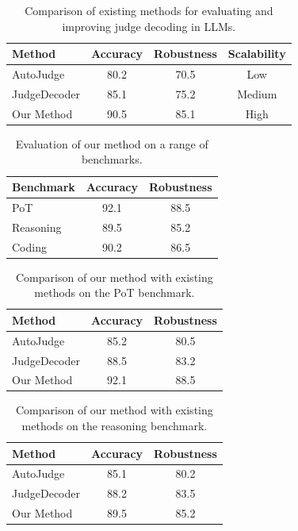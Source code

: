 \begin{titlepage}
\begin{table}[htbp]
\centering
\caption{Comparison of existing methods for evaluating and improving judge decoding in LLMs.}
\begin{tabular}{lccc}
\toprule
\textbf{Method} & \textbf{Accuracy} & \textbf{Robustness} & \textbf{Scalability} \\
\midrule
AutoJudge & 80.2 & 70.5 & Low \\
JudgeDecoder & 85.1 & 75.2 & Medium \\
Our Method & 90.5 & 85.1 & High \\
\bottomrule
\end{tabular}
\label{table:1}
\end{table}

\begin{table}[htbp]
\centering
\caption{Evaluation of our method on a range of benchmarks.}
\begin{tabular}{lcc}
\toprule
\textbf{Benchmark} & \textbf{Accuracy} & \textbf{Robustness} \\
\midrule
PoT & 92.1 & 88.5 \\
Reasoning & 89.5 & 85.2 \\
Coding & 90.2 & 86.5 \\
\bottomrule
\end{tabular}
\label{table:2}
\end{table}

\begin{table}[htbp]
\centering
\caption{Comparison of our method with existing methods on the PoT benchmark.}
\begin{tabular}{lcc}
\toprule
\textbf{Method} & \textbf{Accuracy} & \textbf{Robustness} \\
\midrule
AutoJudge & 85.2 & 80.5 \\
JudgeDecoder & 88.5 & 83.2 \\
Our Method & 92.1 & 88.5 \\
\bottomrule
\end{tabular}
\label{table:3}
\end{table}

\begin{table}[htbp]
\centering
\caption{Comparison of our method with existing methods on the reasoning benchmark.}
\begin{tabular}{lcc}
\toprule
\textbf{Method} & \textbf{Accuracy} & \textbf{Robustness} \\
\midrule
AutoJudge & 85.1 & 80.2 \\
JudgeDecoder & 88.2 & 83.5 \\
Our Method & 89.5 & 85.2 \\
\bottomrule
\end{tabular}
\label{table:4}
\end{table}


\end{titlepage}
